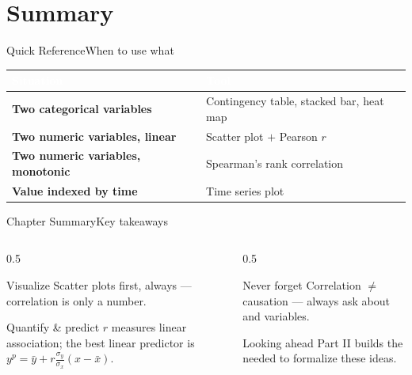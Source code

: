 \documentclass[aspectratio=169,11pt]{beamer}
\begin{document}
\section{Summary}

\begin{frame}{Quick Reference}{When to use what}
  \small
  \renewcommand{\arraystretch}{1.3}
  \begin{center}
  \begin{tabularx}{\textwidth}{@{}>{\bfseries}l >{\raggedright\arraybackslash}X@{}}
    \toprule
    \rowcolor{PrimaryDark}
    \textcolor{white}{Situation} & \textcolor{white}{Tool} \\
    \midrule
    Two categorical variables & Contingency table, stacked bar, heat map \\
    \rowcolor{PrimaryLight!25}
    Two numeric variables, linear & Scatter plot $+$ Pearson $r$ \\
    Two numeric variables, monotonic & Spearman's rank correlation \\
    \rowcolor{PrimaryLight!25}
    Value indexed by time & Time series plot \\
    \bottomrule
  \end{tabularx}
  \end{center}
\end{frame}

\begin{frame}{Chapter Summary}{Key takeaways}
  \begin{columns}[T]
    \begin{column}{0.5\textwidth}
      \begin{block}{Visualize}
        \small Scatter plots first, always — correlation is only a number.
      \end{block}
      \begin{exampleblock}{Quantify \& predict}
        \small $r$ measures linear association; the best linear predictor
        is $y^p = \bar y + r\frac{\sigma_y}{\sigma_x}(x-\bar x)$.
      \end{exampleblock}
    \end{column}
    \begin{column}{0.5\textwidth}
      \begin{alertblock}{Never forget}
        \small Correlation $\neq$ causation — always ask about 
        and  variables.
      \end{alertblock}
      \begin{block}{Looking ahead}
        \small Part II builds the  needed to
        formalize these ideas.
      \end{block}
    \end{column}
  \end{columns}
\end{frame}
\end{document}
